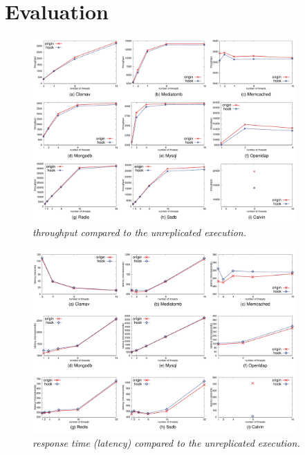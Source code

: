 \section{Evaluation} \label{sec:evaluation}

\begin{figure}[t]
\centering
\includegraphics[width=0.9\textwidth]{figures/throughput}
\vspace{-.20in}
\caption{\small {\em \xxx throughput compared to the unreplicated 
execution.}}
\label{fig:tput}
\end{figure}

\begin{figure}[t]
\centering
\includegraphics[width=0.9\textwidth]{figures/latency}
\vspace{-.20in}
\caption{\small {\em \xxx response time (latency) compared to the unreplicated 
execution.}}
\label{fig:latency}
\end{figure}

